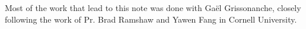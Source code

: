 \documentclass[notitlepage,11pt,nofootinbib]{revtex4-1}
\begin{document}


\begin{acknowledgments}
Most of the work that lead to this note was done with Gaël Grissonanche, closely following the work of Pr. Brad Ramshaw and Yawen Fang in Cornell University.
\end{acknowledgments}



\end{document}
